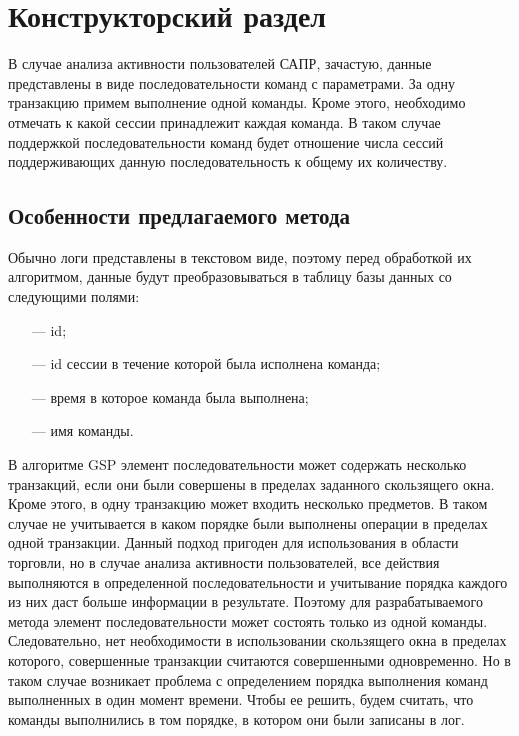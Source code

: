 \chapter{Конструкторский раздел}
\label{cha:design}

В случае анализа активности пользователей САПР, зачастую, данные представлены в виде последовательности команд с параметрами. За одну транзакцию примем выполнение одной команды. Кроме этого, необходимо отмечать к какой сессии принадлежит каждая команда. В таком случае поддержкой последовательности команд будет отношение числа сессий поддерживающих данную последовательность к общему их количеству. 

\section{Особенности предлагаемого метода}
Обычно логи представлены в текстовом виде, поэтому перед обработкой их алгоритмом, данные будут преобразовываться в таблицу базы данных со следующими полями:
\begin{itemize}
	\item[---] id;
	\item[---] id сессии в течение которой была исполнена команда;
	\item[---] время в которое команда была выполнена;
	\item[---] имя команды.
\end{itemize}

В алгоритме GSP элемент последовательности может содержать несколько транзакций, если они были совершены в пределах заданного скользящего окна. Кроме этого, в одну транзакцию может входить несколько предметов. В таком случае не учитывается в каком порядке были
выполнены операции в пределах одной транзакции.
Данный подход пригоден для использования в области торговли, но в случае анализа активности пользователей,
все действия выполняются в определенной последовательности и
учитывание порядка каждого из них даст больше информации в результате.
Поэтому для разрабатываемого метода элемент последовательности может состоять только из одной команды.
Следовательно, нет необходимости в использовании скользящего окна в пределах которого, совершенные транзакции считаются совершенными одновременно. Но в таком случае возникает проблема с определением порядка выполнения команд выполненных в один момент времени. Чтобы ее решить, будем считать, что команды выполнились в том порядке, в котором они были записаны в лог.

